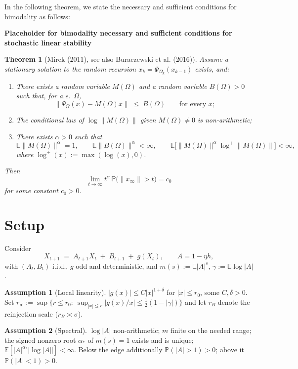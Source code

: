 \documentclass{article} %
\theoremstyle{plain}
\newtheorem{theorem}{Theorem}
\theoremstyle{definition}
\newtheorem{assumption}{Assumption}
\begin{document}
\begin{itemize}[nosep,leftmargin=*]
In the following theorem, we state the necessary and sufficient conditions for bimodality as follows:

\textbf{Placeholder for bimodality necessary and sufficient conditions for stochastic linear stability}


\begin{theorem}[Mirek (2011), see also Buraczewski et al. (2016)]
\label{thm:mirek}
Assume a stationary solution to the random recursion
$x_k = \Psi_{\Omega_k}(x_{k-1})$ exists, and:

\begin{enumerate}
\item[(i)] There exists a random variable $M(\Omega)$ and a random
variable $B(\Omega) > 0$ such that, for a.e.\ $\Omega$,
\[
\|\Psi_\Omega(x) - M(\Omega)x\| \;\le\; B(\Omega) \qquad \text{for every } x;
\]

\item[(ii)] The conditional law of $\log\|M(\Omega)\|$ given
$M(\Omega)\neq 0$ is non-arithmetic;

\item[(iii)] There exists $\alpha > 0$ such that
\[
\mathbb{E}\|M(\Omega)\|^{\alpha} = 1, \qquad
\mathbb{E}\|B(\Omega)\|^{\alpha} < \infty, \qquad
\mathbb{E}\big[\|M(\Omega)\|^{\alpha}\log^{+}\|M(\Omega)\|\big] < \infty,
\]
where $\log^{+}(x) := \max(\log(x),0)$.
\end{enumerate}

Then
\[
\lim_{t\to\infty} t^{\alpha}\, \mathbb{P}\big(\|x_\infty\| > t\big) = c_0
\]
for some constant $c_0 > 0$.
\end{theorem}


\section*{Setup}

Consider
\[
X_{t+1} \;=\; A_{t+1}X_t \;+\; B_{t+1} \;+\; g(X_t),
\qquad A = 1-\eta h,
\]
with $(A_t,B_t)$ i.i.d., $g$ odd and deterministic, and
$m(s):=\mathbb{E}|A|^s$, $\gamma:=\mathbb{E}\log|A|$.


\begin{assumption}[Local linearity]\label{a1}
$|g(x)|\le C|x|^{1+\delta}$ for $|x|\le r_0$, some $C,\delta>0$.
Set $r_{\mathrm{nl}}:=\sup\{r\le r_0:\ \sup_{|x|\le r}|g(x)/x|\le\tfrac12(1-|\gamma|)\}$
and let $r_B$ denote the reinjection scale ($r_B\asymp\sigma$).
\end{assumption}

\begin{assumption}[Spectral]\label{a2}
$\log|A|$ non-arithmetic; $m$ finite on the needed range; the signed nonzero
root $\alpha_*$ of $m(s)=1$ exists and is unique;
$\mathbb E[|A|^{\alpha_*}|\log|A||]<\infty$. Below the edge additionally
$\mathbb P(|A|>1)>0$; above it $\mathbb P(|A|<1)>0$.
\end{assumption}


\end{itemize}
\end{document}
